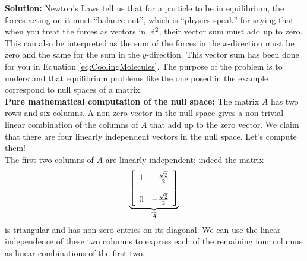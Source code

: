 \textbf{Solution:} Newton's Laws tell us that for a particle to be in equilibrium, the forces acting on it must ``balance out'', which is ``physics-speak'' for saying that when you treat the forces as vectors in $\mathbb R^2$, their vector sum must add up to zero. This can also be interpreted as the sum of the forces in the $x$-direction must be zero and the same for the sum in the $y$-direction. This vector sum has been done for you in Equation \eqref{eq:CoolingMolecules}. The purpose of the problem is to understand that equilibrium problems like the one posed in the example correspond to null spaces of a matrix.\\

\textbf{Pure mathematical computation of the null space:} The matrix $A$ has two rows and six columns. A non-zero vector in the null space gives a non-trivial linear combination of the columns of $A$ that add up to the zero vector. We claim that there are four linearly independent vectors in the null space. Let's compute them! \\

The first two columns of $A$ are linearly independent; indeed the matrix 
$$\underbrace{\left[\begin{array}{rr}  1 & \frac{\sqrt{2}}{2} \bigskip \\ 0 & -\frac{\sqrt{2}}{2} \end{array} \right]}_{\overline{A}}$$
is triangular and has non-zero entries on its diagonal. We can use the linear independence of these two columns  to express each of the remaining four columns as linear combinations of the first two.\\

